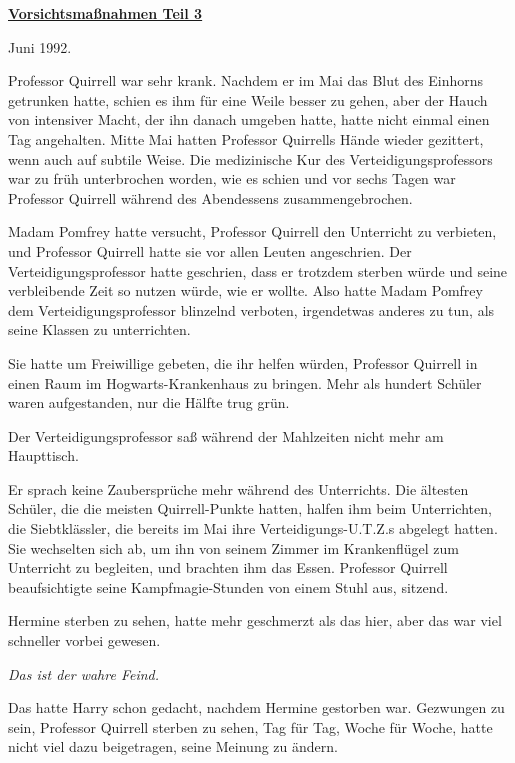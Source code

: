 

\hypertarget{vorsichtsmauxdfnahmen-teil-3}{%

\textbf{\uline{Vorsichtsmaßnahmen Teil 3}}

Juni 1992.

Professor Quirrell war sehr krank. Nachdem er im Mai das Blut des Einhorns getrunken hatte, schien es ihm für eine Weile besser zu gehen, aber der Hauch von intensiver Macht, der ihn danach umgeben hatte, hatte nicht einmal einen Tag angehalten. Mitte Mai hatten Professor Quirrells Hände wieder gezittert, wenn auch auf subtile Weise. Die medizinische Kur des Verteidigungsprofessors war zu früh unterbrochen worden, wie es schien und vor sechs Tagen war Professor Quirrell während des Abendessens zusammengebrochen.

Madam Pomfrey hatte versucht, Professor Quirrell den Unterricht zu verbieten, und Professor Quirrell hatte sie vor allen Leuten angeschrien. Der Verteidigungsprofessor hatte geschrien, dass er trotzdem sterben würde und seine verbleibende Zeit so nutzen würde, wie er wollte. Also hatte Madam Pomfrey dem Verteidigungsprofessor blinzelnd verboten, irgendetwas anderes zu tun, als seine Klassen zu unterrichten.

Sie hatte um Freiwillige gebeten, die ihr helfen würden, Professor Quirrell in einen Raum im Hogwarts-Krankenhaus zu bringen. Mehr als hundert Schüler waren aufgestanden, nur die Hälfte trug grün.

Der Verteidigungsprofessor saß während der Mahlzeiten nicht mehr am Haupttisch.

Er sprach keine Zaubersprüche mehr während des Unterrichts. Die ältesten Schüler, die die meisten Quirrell-Punkte hatten, halfen ihm beim Unterrichten, die Siebtklässler, die bereits im Mai ihre Verteidigungs-U.T.Z.s abgelegt hatten. Sie wechselten sich ab, um ihn von seinem Zimmer im Krankenflügel zum Unterricht zu begleiten, und brachten ihm das Essen. Professor Quirrell beaufsichtigte seine Kampfmagie-Stunden von einem Stuhl aus, sitzend.

Hermine sterben zu sehen, hatte mehr geschmerzt als das hier, aber das war viel schneller vorbei gewesen.

\emph{Das ist der wahre Feind.}

Das hatte Harry schon gedacht, nachdem Hermine gestorben war. Gezwungen zu sein, Professor Quirrell sterben zu sehen, Tag für Tag, Woche für Woche, hatte nicht viel dazu beigetragen, seine Meinung zu ändern.

}
